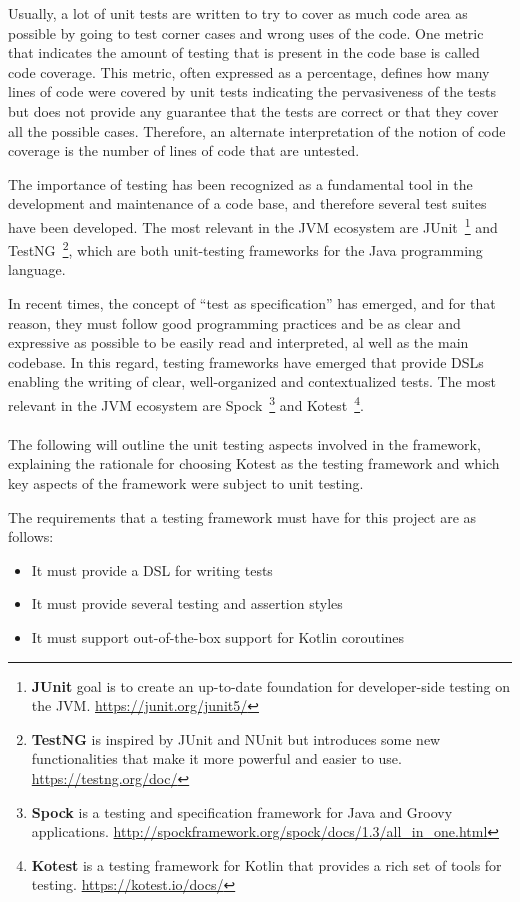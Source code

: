 Usually, a lot of unit tests are written to try to cover as much code area as possible by going to test corner cases and wrong uses of the code.
One metric that indicates the amount of testing that is present in the code base is called code coverage.
This metric, often expressed as a percentage, defines how many lines of code were covered by unit tests indicating the
pervasiveness of the tests but does not provide any guarantee that the tests are correct or that they cover all the possible cases.
Therefore, an alternate interpretation of the notion of code coverage is the number of lines of code that are untested.

The importance of testing has been recognized as a fundamental tool in the development and maintenance of a code base, and therefore
several test suites have been developed.
The most relevant in the JVM ecosystem are JUnit~\footnote{\textbf{JUnit} goal is to create an up-to-date foundation for developer-side testing on
	the JVM. \url{https://junit.org/junit5/}}
and TestNG~\footnote{\textbf{TestNG} is inspired by JUnit and NUnit but introduces some new functionalities that make it more powerful and easier to
	use. \url{https://testng.org/doc/}}, which are both unit-testing frameworks for the Java programming language.

In recent times, the concept of ``test as specification'' has emerged, and for that reason, they must follow good programming
practices and be as clear and expressive as possible to be easily read and interpreted, al well as the main codebase.
In this regard, testing frameworks have emerged that provide DSLs enabling the writing of clear, well-organized and contextualized tests.
The most relevant in the JVM ecosystem are Spock~\footnote{\textbf{Spock} is a testing and specification framework for Java and Groovy applications.
	\url{http://spockframework.org/spock/docs/1.3/all\_in\_one.html}} and Kotest~\footnote{\textbf{Kotest} is a testing framework for Kotlin that
	provides a rich set of tools for testing. \url{https://kotest.io/docs/}}.

\paragraph*{}

The following will outline the unit testing aspects involved in the framework, explaining the rationale for choosing Kotest as the testing framework
and which key aspects of the framework were subject to unit testing.

The requirements that a testing framework must have for this project are as follows:
\begin{itemize}
	\item It must provide a DSL for writing tests
	\item It must provide several testing and assertion styles
	\item It must support out-of-the-box support for Kotlin coroutines
\end{itemize}

